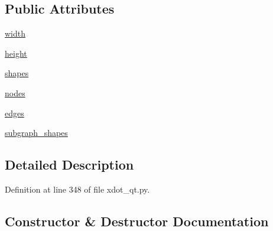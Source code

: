 \subsection*{Public Attributes}
\begin{DoxyCompactItemize}
\item 
\hyperlink{classsmacc__viewer_1_1xdot_1_1xdot__qt_1_1Graph_a7bdb10b7732ab166ccf02997593e0a99}{width}
\item 
\hyperlink{classsmacc__viewer_1_1xdot_1_1xdot__qt_1_1Graph_a4cad77b2943cc64a83492fe2f11fd799}{height}
\item 
\hyperlink{classsmacc__viewer_1_1xdot_1_1xdot__qt_1_1Graph_ab492d3c89dcaa21da68d806f0a319500}{shapes}
\item 
\hyperlink{classsmacc__viewer_1_1xdot_1_1xdot__qt_1_1Graph_ac698552cd98ca56471f189938d2a7237}{nodes}
\item 
\hyperlink{classsmacc__viewer_1_1xdot_1_1xdot__qt_1_1Graph_ae40379a0c30a3797a7db037038fea76d}{edges}
\item 
\hyperlink{classsmacc__viewer_1_1xdot_1_1xdot__qt_1_1Graph_a8470442e6098163b766e6c8a1326c7b6}{subgraph\+\_\+shapes}
\end{DoxyCompactItemize}


\subsection{Detailed Description}


Definition at line 348 of file xdot\+\_\+qt.\+py.



\subsection{Constructor \& Destructor Documentation}
